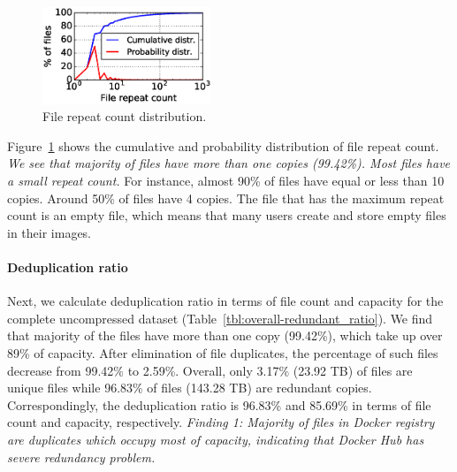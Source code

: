 \begin{figure} \centering
	\includegraphics[width=0.45\textwidth]{graphs/File_repeat_count.eps}
	\caption{File repeat count distribution.  } \label{fig:file-repeat-cnt}
\end{figure}

%
Figure~\ref{fig:file-repeat-cnt} shows the cumulative and probability
distribution of file repeat count.  
%
\textit{We see that majority of files have
more than one copies (99.42\%).  
%
Most files have a small repeat count.} For
instance, almost 90\% of files have equal or less than 10 copies. 
%
Around 50\%
of files have 4 copies. 
%
The file that has the maximum repeat count is an empty
file, which means that many users create and store empty files in their images.

\paragraph{Deduplication ratio}
Next, we calculate deduplication ratio in terms of file count and capacity for
the complete uncompressed dataset (Table~\ref{tbl:overall-redundant_ratio}).
%
We find that majority of the files have more than one copy (99.42\%), which
take up over 89\% of capacity.  
%
After elimination of file duplicates, the
percentage of such files decrease from 99.42\% to 2.59\%.  
%
Overall, only 3.17\%
(23.92 TB) of files are unique files while 96.83\% of files (143.28 TB) are
redundant copies. 
%
Correspondingly, the deduplication ratio is 96.83\% and
85.69\% in terms of file count and capacity, respectively.
%
\textit{Finding 1: Majority of files in Docker registry are duplicates which
occupy most of capacity, indicating that Docker Hub has severe redundancy
problem.}


